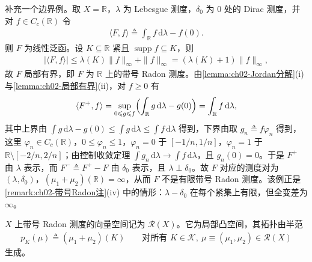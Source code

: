 \documentclass[../../main.tex]{subfiles}%
\begin{document}
\begin{remark}\label{remark:ch02-无限带号例}
补充一个边界例。取 $X=\mathbb R$，$\lambda$ 为 Lebesgue 测度，$\delta_0$ 为 $0$ 处的 Dirac 测度，并对 $f\in C_c(\mathbb R)$ 令
\begin{align*}
\langle F,f\rangle\triangleq\int_{\mathbb R}f\,\mathrm{d}\lambda-f(0).
\end{align*}
则 $F$ 为线性泛函。设 $K\subseteq\mathbb R$ 紧且 $\operatorname{supp}f\subseteq K$，则
\begin{align*}
|\langle F,f\rangle|\leqslant\lambda(K)\|f\|_\infty+\|f\|_\infty=(\lambda(K)+1)\|f\|_\infty,
\end{align*}
故 $F$ 局部有界，即 $F$ 为 $\mathbb R$ 上的带号 Radon 测度。由\cref{lemma:ch02-Jordan分解}(i) 与\cref{lemma:ch02-局部有界}(ii)，对 $f\geqslant0$ 有
\begin{align*}
\langle F^+,f\rangle=\sup_{0\leqslant g\leqslant f}\Bigl(\int_{\mathbb R}g\,\mathrm{d}\lambda-g(0)\Bigr)=\int_{\mathbb R}f\,\mathrm{d}\lambda,
\end{align*}
其中上界由 $\int g\,\mathrm{d}\lambda-g(0)\leqslant\int g\,\mathrm{d}\lambda\leqslant\int f\,\mathrm{d}\lambda$ 得到，下界由取 $g_n\triangleq f\varphi_n$ 得到，这里 $\varphi_n\in C_c(\mathbb R)$，$0\leqslant\varphi_n\leqslant1$，$\varphi_n=0$ 于 $[-1/n,1/n]$，$\varphi_n=1$ 于 $\mathbb R\setminus[-2/n,2/n]$；由控制收敛定理 $\int g_n\,\mathrm{d}\lambda\to\int f\,\mathrm{d}\lambda$，且 $g_n(0)=0$。于是 $F^+$ 由 $\lambda$ 表示，而 $F^-\triangleq F^+-F$ 由 $\delta_0$ 表示，且 $\lambda\perp\delta_0$。故 $F$ 对应的测度对为 $(\lambda,\delta_0)$，$(\mu_1+\mu_2)(\mathbb R)=\infty$，从而 $F$ 不是有限带号 Radon 测度。该例正是\cref{remark:ch02-带号Radon注}(iv) 中的情形：$\lambda-\delta_0$ 在每个紧集上有限，但全变差为 $\infty$。
\end{remark}

$X$ 上带号 Radon 测度的向量空间记为 $\mathscr R(X)$。它为局部凸空间，其拓扑由半范
\begin{align*}
p_K(\mu)\triangleq(\mu_1+\mu_2)(K)\qquad\text{对所有 }K\in\mathscr K,\ \mu\equiv(\mu_1,\mu_2)\in\mathscr R(X)
\end{align*}
生成。
\end{document}
